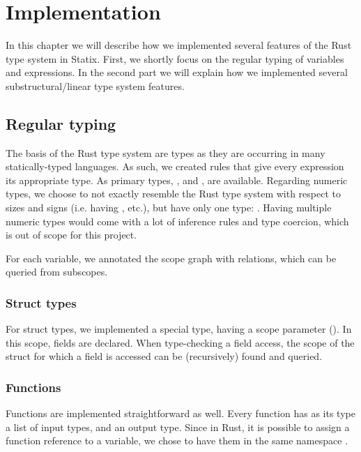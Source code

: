 \section{Implementation} \label{s:implementation}

In this chapter we will describe how we implemented several features of the Rust type system in Statix. First, we shortly focus on the regular typing of variables and expressions. In the second part we will explain how we implemented several substructural/linear type system features.

\subsection{Regular typing}

The basis of the Rust type system are types as they are occurring in many statically-typed languages. As such, we created rules  that give every expression its appropriate type. As primary types, ,  and , are available. Regarding numeric types, we choose to not exactly resemble the Rust type system with respect to sizes and signs (i.e. having ,  etc.), but have only one type: . Having multiple numeric types would come with a lot of inference rules and type coercion, which is out of scope for this project.

For each variable, we annotated the scope graph with  relations, which can be queried from subscopes.

\subsubsection{Struct types}

For struct types, we implemented a special type, having a scope parameter (). In this scope, fields are declared. When type-checking a field access, the scope of the struct for which a field is accessed can be (recursively) found and queried.

\subsubsection{Functions}

Functions are implemented straightforward as well. Every function has as its type a list of input types, and an output type. Since in Rust, it is possible to assign a function reference to a variable, we chose to have them in the same namespace .

